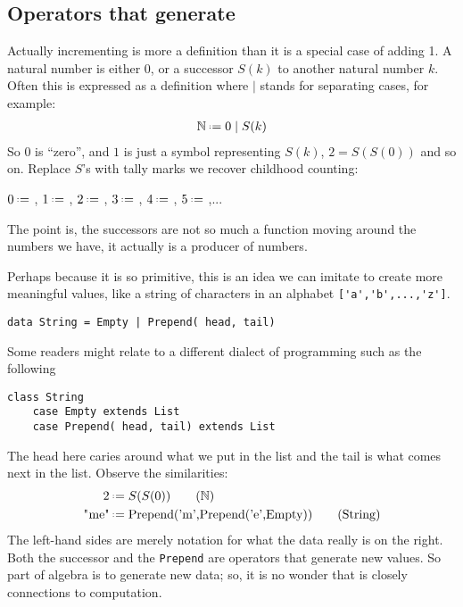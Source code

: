 \subsection{Operators that generate}
Actually incrementing is more a definition than it is a 
special case of adding 1.
A natural number is either $0$, or a successor 
$S(k)$ to 
another natural number $k$.  Often this is expressed as a 
definition where $\mid$ stands for separating cases, 
for example:
\begin{align*}
    \mathbb{N} \defeq 0 \mid S(k)
\end{align*}
So $0$ is ``zero'', and $1$ is just a symbol representing $S(k)$, 
$2=S(S(0))$ and so on.  Replace $S$'s with tally marks 
we recover childhood counting:
\begin{center}
    $0\defeq$ \underline{\hspace{5mm}}, 
    $1\defeq$ \StrokeOne,
    $2\defeq$ \StrokeTwo,
    $3\defeq$ \StrokeThree,
    $4\defeq$ \StrokeFour,
    $5\defeq$ \StrokeFive,...
\end{center}
The point is, the successors are not so much a function 
moving around the numbers we have, it actually is a producer 
of numbers. 

Perhaps because it is so primitive, this is an idea we 
can imitate to create more meaningful values, like a string 
of characters in an alphabet \lstinline{['a','b',...,'z']}.
\begin{lstlisting}[language=Hidris]
data String = Empty | Prepend( head, tail) 
\end{lstlisting}
Some readers might relate to a different dialect of 
programming such as the following
\begin{lstlisting}[language=Sava]
class String
    case Empty extends List
    case Prepend( head, tail) extends List
\end{lstlisting}
The head here caries around what we put in the list and the tail 
is what comes next in the list.  Observe the similarities:
\begin{align}
     2 & \defeq S(S(0)) \tag{$\mathbb{N}$}\\
 \text{\lstinline{"me"}} & \defeq \text{\lstinline{Prepend('m',Prepend('e',Empty))}}
\tag{String}
\end{align}
The left-hand sides are merely notation for what the data really is on the right.
Both the successor and the \lstinline{Prepend} are operators that generate 
new values.  So part of algebra is to generate new data; so, it is no wonder 
that is closely connections to computation.

